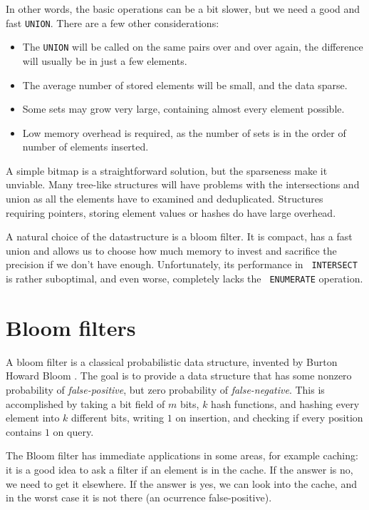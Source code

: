 In other words, the basic operations can be a bit slower, but we need a good and
fast {\tt UNION}. There are a few other considerations:

\begin{itemize}
	\item The {\tt UNION} will be called on the same pairs over and over again,
		the difference will usually be in just a few elements.
	\item The average number of stored elements will be small, and the data sparse.
	\item Some sets may grow very large, containing almost every element possible.
	\item Low memory overhead is required, as the number of sets is in the order
		of number of elements inserted.
\end{itemize}

A simple bitmap is a straightforward solution, but the sparseness make it
unviable. Many tree-like structures will have problems with the intersections
and union as all the elements have to examined and deduplicated. Structures
requiring pointers, storing element values or hashes do have large overhead.

A natural choice of the datastructure is a bloom filter. It is compact, has a
fast union and allows us to choose how much memory to invest and sacrifice the
precision if we don't have enough. Unfortunately, its performance in {\tt
INTERSECT} is rather suboptimal, and even worse, completely lacks the {\tt
ENUMERATE} operation.


\section{Bloom filters}

A bloom filter is a classical probabilistic data structure, invented by Burton
Howard Bloom \cite{Bloom1970}. The goal is to provide a data structure
that has some nonzero probability of {\it false-positive}, but zero probability
of {\it false-negative}. This is accomplished by taking a bit field of $m$ bits,
$k$ hash functions, and hashing every element into $k$ different bits, writing
$1$ on insertion, and checking if every position contains $1$ on query.

The Bloom filter has immediate applications in some areas, for example caching:
it is a good idea to ask a filter if an element is in the cache. If the answer is
no, we need to get it elsewhere. If the answer is yes, we can look into the
cache, and in the worst case it is not there (an ocurrence false-positive).

